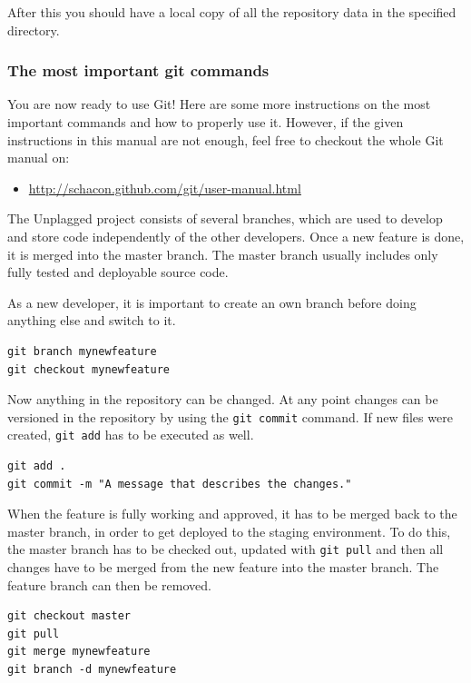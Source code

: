 After this you should have a local copy of all the repository data in the specified directory.

\subsubsection{The most important git commands}

You are now ready to use Git! Here are some more instructions on the most important commands and how to properly 
use it. 
However, if the given instructions in this manual are not enough, feel free to checkout the whole Git manual on: 

\begin{itemize}
\item \url{http://schacon.github.com/git/user-manual.html}
\end{itemize}

The Unplagged project consists of several branches, which are used to develop and store code independently of the other 
developers. Once a new feature is done, it is merged into the master branch. The master branch usually includes only 
fully tested and deployable source code. 

As a new developer, it is important to create an own branch before doing anything else and switch to it.

\begin{lstlisting}[caption=Creating branches]
git branch mynewfeature
git checkout mynewfeature
\end{lstlisting}

Now anything in the repository can be changed. At any point changes can be versioned in the repository by using the 
\texttt{git commit} 
command. If new files were created, \texttt{git add} has to be executed as well.

\begin{lstlisting}[caption=Adding all new files and commiting]
git add .
git commit -m "A message that describes the changes."
\end{lstlisting}

When the feature is fully working and approved, it has to be merged back to the master branch, in order to get 
deployed to the staging environment. To do this, the master branch has to be checked out, updated with \texttt{git pull} 
and then all changes have to be merged from the new feature into the master branch. The feature branch can then be
removed.

\begin{lstlisting}[caption=Merging branch into master]
git checkout master
git pull
git merge mynewfeature
git branch -d mynewfeature
\end{lstlisting}

